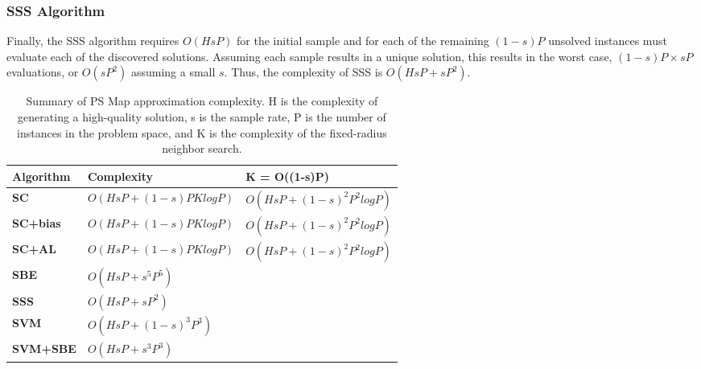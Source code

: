 \subsubsection{SSS Algorithm} Finally, the SSS algorithm requires $O(HsP)$ for the initial sample and for each of  the remaining $(1-s)P$ unsolved instances must evaluate each of the discovered solutions.  Assuming each sample results in a unique solution, this results in the worst case, $(1-s)P \times sP$ evaluations, or $O(sP^2)$ assuming a small $s$.  Thus, the complexity of SSS is $O(HsP + sP^2)$.

\begin{table}
\begin{center}
  \begin{tabular}{|p{2cm}|p{5cm}|p{5cm}|}
    \hline
    \textbf{Algorithm} & \textbf{Complexity} & \textbf{K = O((1-s)P)}     \\ \hline
    \textbf{SC} &       $O(HsP + (1-s)PKlogP)$   & $O(HsP + (1-s)^2P^2logP)$ \\ \hline
    \textbf{SC+bias} &  $O(HsP + (1-s)PKlogP)$   & $O(HsP + (1-s)^2P^2logP)$ \\ \hline
    \textbf{SC+AL} &    $O(HsP + (1-s)PKlogP)$   & $O(HsP + (1-s)^2P^2logP)$ \\ \hline
    \textbf{SBE} &      $O(HsP + s^5P^5)$         &\\ \hline
    \textbf{SSS} &      $O(HsP + sP^2)$           &\\ \hline
    \textbf{SVM} &      $O(HsP + (1-s)^3P^3)$     &\\ \hline
    \textbf{SVM+SBE} &  $O(HsP + s^3P^3)$         &\\ \hline
  \end{tabular}
  \caption{Summary of PS Map approximation complexity. H is the complexity of generating a high-quality solution, s is the sample rate, P is the number of instances in the problem space, and K is the complexity of the fixed-radius neighbor search.}
  \label{tab:summary-of-complexity}
\end{center}
\end{table}
